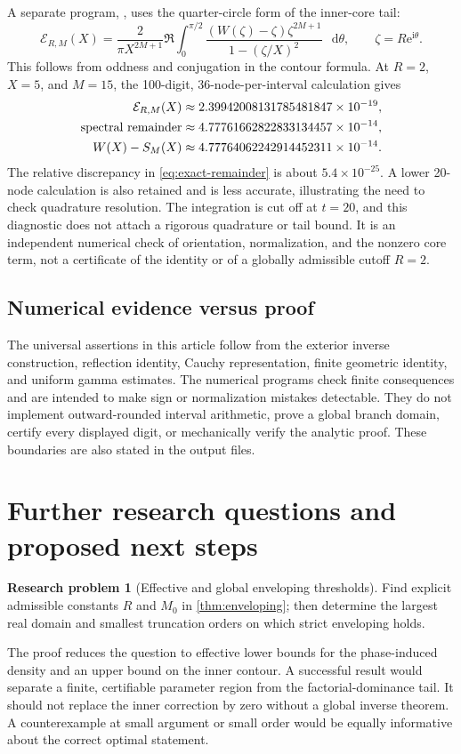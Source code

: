 \documentclass[11pt,a4paper]{article}
\theoremstyle{definition}
\newtheorem{problem}{Research problem}
\numberwithin{equation}{section}
\newcommand{\dd}{\mathop{}\!\mathrm{d}}
\newcommand{\ii}{\mathrm{i}}
\newcommand{\ee}{\mathrm{e}}
\begin{document}
A separate program, , uses the quarter-circle form of the inner-core tail:
\begin{equation}
 \mathcal E_{R,M}(X)=\frac{2}{\pi X^{2M+1}}\Re
 \int_0^{\pi/2}
 \frac{(W(\zeta)-\zeta)\zeta^{2M+1}}{1-(\zeta/X)^2}\,\dd\theta,
 \qquad \zeta=R\ee^{\ii\theta}.
 \label{eq:quarter-core}
\end{equation}
This follows from oddness and conjugation in the contour formula. At $R=2$, $X=5$, and $M=15$, the 100-digit, 36-node-per-interval calculation gives
\begin{align}
 \mathcal E_{R,M}(X)&\approx2.39942008131785481847\times10^{-19},\notag\\
 \text{spectral remainder}&\approx4.77761662822833134457\times10^{-14},\notag\\
 W(X)-S_M(X)&\approx4.77764062242914452311\times10^{-14}.
 \label{eq:contour-numbers}
\end{align}
The relative discrepancy in \eqref{eq:exact-remainder} is about
$5.4\times10^{-25}$. A lower 20-node calculation is also retained and is less accurate, illustrating the need to check quadrature resolution. The integration is cut off at $t=20$, and this diagnostic does not attach a rigorous quadrature or tail bound. It is an independent numerical check of orientation, normalization, and the nonzero core term, not a certificate of the identity or of a globally admissible cutoff $R=2$.

\subsection{Numerical evidence versus proof}
The universal assertions in this article follow from the exterior inverse construction, reflection identity, Cauchy representation, finite geometric identity, and uniform gamma estimates. The numerical programs check finite consequences and are intended to make sign or normalization mistakes detectable. They do not implement outward-rounded interval arithmetic, prove a global branch domain, certify every displayed digit, or mechanically verify the analytic proof. These boundaries are also stated in the output files.

\section{Further research questions and proposed next steps}
\label{sec:questions}

\begin{problem}[Effective and global enveloping thresholds]
Find explicit admissible constants $R$ and $M_0$ in \cref{thm:enveloping}; then determine the largest real domain and smallest truncation orders on which strict enveloping holds.
\end{problem}
The proof reduces the question to effective lower bounds for the phase-induced density and an upper bound on the inner contour. A successful result would separate a finite, certifiable parameter region from the factorial-dominance tail. It should not replace the inner correction by zero without a global inverse theorem. A counterexample at small argument or small order would be equally informative about the correct optimal statement.
\end{document}
